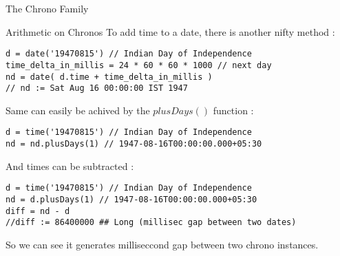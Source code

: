 \begin{section}{The Chrono Family}
\begin{subsection}{Arithmetic on Chronos}
To add time to a date, there is another nifty method :

\begin{lstlisting}[style=JexlStyle]
d = date('19470815') // Indian Day of Independence  
time_delta_in_millis = 24 * 60 * 60 * 1000 // next day 
nd = date( d.time + time_delta_in_millis ) 
// nd := Sat Aug 16 00:00:00 IST 1947 
\end{lstlisting}

Same can easily be achived by the $plusDays()$ function :

\begin{lstlisting}[style=JexlStyle]
d = time('19470815') // Indian Day of Independence  
nd = nd.plusDays(1) // 1947-08-16T00:00:00.000+05:30 
\end{lstlisting}

And times can be subtracted :

\begin{lstlisting}[style=JexlStyle]
d = time('19470815') // Indian Day of Independence  
nd = d.plusDays(1) // 1947-08-16T00:00:00.000+05:30 
diff = nd - d 
//diff := 86400000 ## Long (millisec gap between two dates)
\end{lstlisting}

So we can see it generates milliseccond gap between two chrono instances.

\end{subsection}

\end{section}

